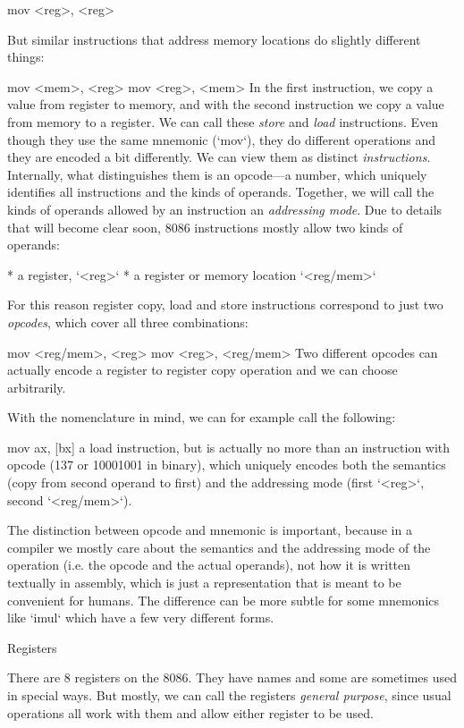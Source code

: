 \begtt \optparams
mov <reg>, <reg>
\endtt

But similar instructions that address memory locations do slightly different
things:

\begtt \optparams
mov <mem>, <reg>
mov <reg>, <mem>
\endtt
%
In the first instruction, we copy a value from register to memory, and with the
second instruction we copy a value from memory to a register. We can call these
{\em store} and {\em load} instructions. Even though they use the same mnemonic
(`mov`), they do different operations and they are encoded a bit differently.
We can view them as distinct {\em instructions}. Internally, what distinguishes
them is an opcode---a number, which uniquely
identifies all instructions and the kinds of operands. Together, we will call
the kinds of operands allowed by an instruction an {\em addressing mode}. Due to
details that will become clear soon, 8086 instructions mostly allow two kinds of
operands:

\begitems
* a register, `<reg>`
* a register or memory location `<reg/mem>`
\enditems

For this reason register copy, load and store instructions correspond to just
two {\em opcodes}, which cover all three combinations:

\begtt \optparams
mov <reg/mem>, <reg>
mov <reg>, <reg/mem>
\endtt
%
Two different opcodes can actually encode a register to register copy
operation and we can choose arbitrarily.

With the nomenclature in mind, we can for example call the following:

\begtt
mov ax, [bx]
\endtt
%
a load instruction, but is actually no more than an instruction
with opcode (137 or 10001001 in binary), which uniquely encodes both the
semantics (copy from second operand to first) and the addressing mode (first
`<reg>`, second `<reg/mem>`).

The distinction between opcode and mnemonic is important, because in a compiler we
mostly care about the semantics and the addressing mode of the operation (i.e. the
opcode and the actual operands), not how it is written textually in assembly,
which is just a representation that is meant to be convenient for humans. The
difference can be more subtle for some mnemonics like `imul` which have a few
very different forms.

\secc Registers

There are 8 registers on the 8086. They have names and some are
sometimes used in special ways. But mostly, we can call the registers {\em general
purpose}, since usual operations all work with them and allow either register to
be used.

